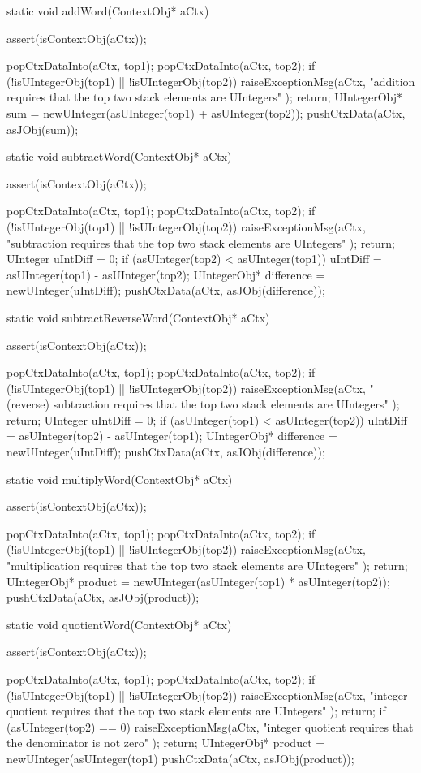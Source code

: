 \startCCode
static void addWord(ContextObj* aCtx) {
  assert(isContextObj(aCtx));

  popCtxDataInto(aCtx, top1);
  popCtxDataInto(aCtx, top2);
  if (!isUIntegerObj(top1) || !isUIntegerObj(top2)) {
    raiseExceptionMsg(aCtx,
      "addition requires that the top two stack elements are UIntegers"
    );
    return;
  }
  UIntegerObj* sum = newUInteger(asUInteger(top1) + asUInteger(top2));
  pushCtxData(aCtx, asJObj(sum));
}
\stopCCode

\startCCode
static void subtractWord(ContextObj* aCtx) {
  assert(isContextObj(aCtx));

  popCtxDataInto(aCtx, top1);
  popCtxDataInto(aCtx, top2);
  if (!isUIntegerObj(top1) || !isUIntegerObj(top2)) {
    raiseExceptionMsg(aCtx,
      "subtraction requires that the top two stack elements are UIntegers"
    );
    return;
  }
  UInteger uIntDiff = 0;
  if (asUInteger(top2) < asUInteger(top1)) {
    uIntDiff = asUInteger(top1) - asUInteger(top2);
  }
  UIntegerObj* difference = newUInteger(uIntDiff);
  pushCtxData(aCtx, asJObj(difference));
}
\stopCCode

\startCCode
static void subtractReverseWord(ContextObj* aCtx) {
  assert(isContextObj(aCtx));

  popCtxDataInto(aCtx, top1);
  popCtxDataInto(aCtx, top2);
  if (!isUIntegerObj(top1) || !isUIntegerObj(top2)) {
    raiseExceptionMsg(aCtx,
      "(reverse) subtraction requires that the top two stack elements are UIntegers"
    );
    return;
  }
  UInteger uIntDiff = 0;
  if (asUInteger(top1) < asUInteger(top2)) {
    uIntDiff = asUInteger(top2) - asUInteger(top1);
  }
  UIntegerObj* difference = newUInteger(uIntDiff);
  pushCtxData(aCtx, asJObj(difference));
}
\stopCCode

\startCCode
static void multiplyWord(ContextObj* aCtx) {
  assert(isContextObj(aCtx));
  
  popCtxDataInto(aCtx, top1);
  popCtxDataInto(aCtx, top2);
  if (!isUIntegerObj(top1) || !isUIntegerObj(top2)) {
    raiseExceptionMsg(aCtx,
      "multiplication requires that the top two stack elements are UIntegers"
    );
    return;
  }
  UIntegerObj* product = newUInteger(asUInteger(top1) * asUInteger(top2));
  pushCtxData(aCtx, asJObj(product));
}
\stopCCode

\startCCode
static void quotientWord(ContextObj* aCtx) {
  assert(isContextObj(aCtx));

  popCtxDataInto(aCtx, top1);
  popCtxDataInto(aCtx, top2);
  if (!isUIntegerObj(top1) || !isUIntegerObj(top2)) {
    raiseExceptionMsg(aCtx,
      "integer quotient requires that the top two stack elements are UIntegers"
    );
    return;
  }
  if (asUInteger(top2) == 0) {
    raiseExceptionMsg(aCtx,
      "integer quotient requires that the denominator is not zero"
    );
    return;
  }
  UIntegerObj* product = newUInteger(asUInteger(top1) %
  pushCtxData(aCtx, asJObj(product));
}

